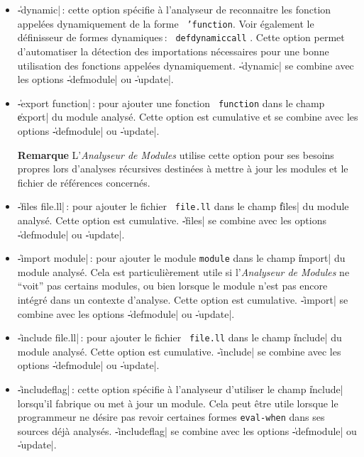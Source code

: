\begin{itemize}
\item {\Large \|-dynamic|}\,: cette option sp\'{e}cifie \`{a} l'analyseur de
reconnaitre les fonction appel\'{e}es dynamiquement de la forme {\tt
'function}. Voir \'{e}galement le d\'{e}finisseur de formes dynamiques\,: {\tt
defdynamiccall} .
Cette option permet d'automatiser la d\'{e}tection des importations
n\'{e}cessaires pour une bonne utilisation des fonctions appel\'{e}es
dynamiquement.
\|-dynamic| se combine avec les options \|-defmodule| ou \|-update|.

\item {\Large \|-export function|}\,: pour ajouter une fonction {\tt
function} dans le champ \|export| du module analys\'{e}. 
Cette option
est cumulative et se combine avec les options \|-defmodule| ou
\|-update|. \\
\begin{Side}{\bf Remarque}
L'{\em Analyseur de Modules} utilise cette option pour ses
besoins propres 
lors d'analyses r\'{e}cursives destin\'{e}es \`{a} mettre \`{a} jour
les modules et le fichier de r\'{e}f\'{e}rences concern\'{e}s.
\end{Side}

\item {\Large \|-files file.ll|}\,: pour ajouter le fichier {\tt
file.ll} dans le champ \|files| du module analys\'{e}. 
Cette option est cumulative.
\|-files| se combine avec les options \|-defmodule| ou \|-update|.

\item {\Large \|-import module|}\,: pour ajouter
le module {\tt module} dans le champ \|import| du module analys\'{e}. 
Cela est
particuli\`{e}rement utile si l'{\em Analyseur de Modules} ne ``voit''
pas certains 
modules, ou bien lorsque le module n'est pas encore int\'{e}gr\'{e} dans un
contexte d'analyse. Cette option est cumulative.
\|-import| se combine avec les options \|-defmodule| ou \|-update|.

\item {\Large \|-include file.ll|}\,: pour ajouter le fichier {\tt
file.ll} dans le champ \|include| du module analys\'{e}. Cette option
est cumulative.
\|-include| se combine avec les options \|-defmodule| ou \|-update|.

\item {\Large \|-includeflag|}\,: cette option sp\'{e}cifie \`{a} l'analyseur
d'utiliser le champ \|include| lorsqu'il fabrique ou met \`{a} jour un
module. Cela peut \^{e}tre utile lorsque le programmeur ne d\'{e}sire pas
revoir certaines formes {\tt eval-when} dans ses sources d\'{e}j\`{a}
analys\'{e}s. 
\|-includeflag| se combine avec les options \|-defmodule| ou \|-update|.


\end{itemize}
